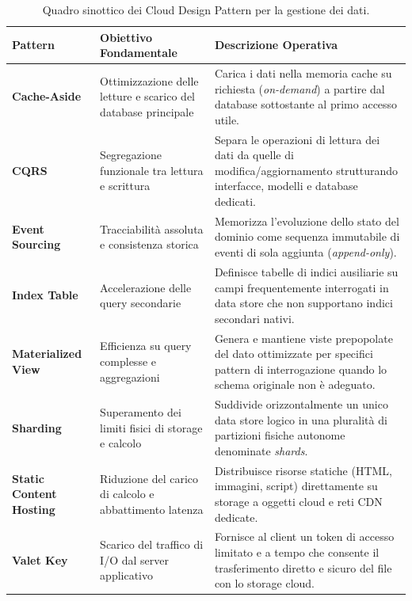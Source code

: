 \documentclass[11pt, a4paper]{article}
\begin{document}
\begin{table}[H]
\centering
\small
\renewcommand{\arraystretch}{1.3}
\begin{tabularx}{\textwidth}{l p{3.8cm} X}
\toprule
\textbf{Pattern} & \textbf{Obiettivo Fondamentale} & \textbf{Descrizione Operativa} \\
\midrule
\textbf{Cache-Aside} & Ottimizzazione delle letture e scarico del database principale & Carica i dati nella memoria cache su richiesta (\emph{on-demand}) a partire dal database sottostante al primo accesso utile. \\
\textbf{CQRS} & Segregazione funzionale tra lettura e scrittura & Separa le operazioni di lettura dei dati da quelle di modifica/aggiornamento strutturando interfacce, modelli e database dedicati. \\
\textbf{Event Sourcing} & Tracciabilità assoluta e consistenza storica & Memorizza l'evoluzione dello stato del dominio come sequenza immutabile di eventi di sola aggiunta (\emph{append-only}). \\
\textbf{Index Table} & Accelerazione delle query secondarie & Definisce tabelle di indici ausiliarie su campi frequentemente interrogati in data store che non supportano indici secondari nativi. \\
\textbf{Materialized View} & Efficienza su query complesse e aggregazioni & Genera e mantiene viste prepopolate del dato ottimizzate per specifici pattern di interrogazione quando lo schema originale non è adeguato. \\
\textbf{Sharding} & Superamento dei limiti fisici di storage e calcolo & Suddivide orizzontalmente un unico data store logico in una pluralità di partizioni fisiche autonome denominate \emph{shards}. \\
\textbf{Static Content Hosting} & Riduzione del carico di calcolo e abbattimento latenza & Distribuisce risorse statiche (HTML, immagini, script) direttamente su storage a oggetti cloud e reti CDN dedicate. \\
\textbf{Valet Key} & Scarico del traffico di I/O dal server applicativo & Fornisce al client un token di accesso limitato e a tempo che consente il trasferimento diretto e sicuro del file con lo storage cloud. \\
\bottomrule
\end{tabularx}
\caption{Quadro sinottico dei Cloud Design Pattern per la gestione dei dati.}
\label{tab:data_patterns}
\end{table}

\newpage
\end{document}
